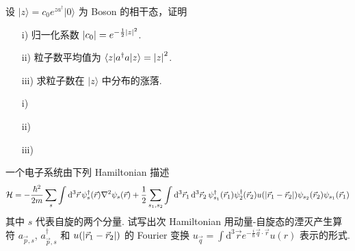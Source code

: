 \documentclass{assignment}
\begin{document}
\begin{prob}
    设 $\lvert z\rangle=c_0e^{za^{\dagger}}\lvert 0\rangle$ 为 Boson 的相干态，证明
    \begin{itemize}
        \item[i)] 归一化系数 $\left\lvert c_0\right\rvert=e^{-\frac{1}{2}\left\lvert z\right\rvert^2}$.
        \item[ii)] 粒子数平均值为 $\langle z\rvert a^{\dagger}a\lvert z\rangle=\left\lvert z\right\rvert^2$.
        \item[iii)] 求粒子数在 $\lvert z\rangle$ 中分布的涨落.
    \end{itemize}
\end{prob}
\begin{pf}
    \begin{itemize}
        \item[i)] 
        \item[ii)] 
        \item[iii)] 
    \end{itemize}
\end{pf}

\begin{prob}
    一个电子系统由下列 Hamiltonian 描述
    \begin{align}
        \mathcal{H}=-\frac{\hbar^2}{2m}\sum_s\int\mathrm{d}^3\vec{r}\,\psi_s^{\dagger}(\vec{r})\nabla^2\psi_s(\vec{r})+\frac{1}{2}\sum_{s_1,s_2}\int\mathrm{d}^3\vec{r}_1\,\mathrm{d}^3\vec{r}_2\,\psi_{s_1}^{\dagger}(\vec{r}_1)\psi_2^{\dagger}(\vec{r}_2)u(\left\lvert\vec{r}_1-\vec{r}_2\right\rvert)\psi_{s_2}(\vec{r}_2)\psi_{s_1}(\vec{r}_1)
    \end{align}
    其中 $s$ 代表自旋的两个分量. 试写出次 Hamiltonian 用动量-自旋态的湮灭产生算符 $a_{\vec{p},s}$, $a_{\vec{p},s}^{\dagger}$ 和 $u(\left\lvert\vec{r}_1-\vec{r}_2\right\rvert)$ 的 Fourier 变换 $u_{\vec{q}}=\int\mathrm{d}^3\vec{r}e^{-\frac{i}{\hbar}\vec{q}\cdot\vec{r}}u(r)$ 表示的形式.
\end{prob}
\begin{pf}

\end{pf}
\end{document}
